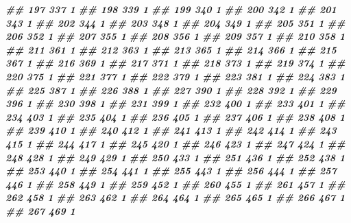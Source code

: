 \documentclass[
]{book}
\newenvironment{Shaded}{\begin{snugshade}}{\end{snugshade}}
\newcommand{\DocumentationTok}[1]{\textcolor[rgb]{0.56,0.35,0.01}{\textbf{\textit{#1}}}}
\theoremstyle{definition}
\theoremstyle{definition}
\theoremstyle{definition}
\theoremstyle{definition}
\theoremstyle{remark}
\begin{document}
\begin{Shaded}
\begin{Highlighting}[]
\DocumentationTok{\#\# 197    337 1}
\DocumentationTok{\#\# 198    339 1}
\DocumentationTok{\#\# 199    340 1}
\DocumentationTok{\#\# 200    342 1}
\DocumentationTok{\#\# 201    343 1}
\DocumentationTok{\#\# 202    344 1}
\DocumentationTok{\#\# 203    348 1}
\DocumentationTok{\#\# 204    349 1}
\DocumentationTok{\#\# 205    351 1}
\DocumentationTok{\#\# 206    352 1}
\DocumentationTok{\#\# 207    355 1}
\DocumentationTok{\#\# 208    356 1}
\DocumentationTok{\#\# 209    357 1}
\DocumentationTok{\#\# 210    358 1}
\DocumentationTok{\#\# 211    361 1}
\DocumentationTok{\#\# 212    363 1}
\DocumentationTok{\#\# 213    365 1}
\DocumentationTok{\#\# 214    366 1}
\DocumentationTok{\#\# 215    367 1}
\DocumentationTok{\#\# 216    369 1}
\DocumentationTok{\#\# 217    371 1}
\DocumentationTok{\#\# 218    373 1}
\DocumentationTok{\#\# 219    374 1}
\DocumentationTok{\#\# 220    375 1}
\DocumentationTok{\#\# 221    377 1}
\DocumentationTok{\#\# 222    379 1}
\DocumentationTok{\#\# 223    381 1}
\DocumentationTok{\#\# 224    383 1}
\DocumentationTok{\#\# 225    387 1}
\DocumentationTok{\#\# 226    388 1}
\DocumentationTok{\#\# 227    390 1}
\DocumentationTok{\#\# 228    392 1}
\DocumentationTok{\#\# 229    396 1}
\DocumentationTok{\#\# 230    398 1}
\DocumentationTok{\#\# 231    399 1}
\DocumentationTok{\#\# 232    400 1}
\DocumentationTok{\#\# 233    401 1}
\DocumentationTok{\#\# 234    403 1}
\DocumentationTok{\#\# 235    404 1}
\DocumentationTok{\#\# 236    405 1}
\DocumentationTok{\#\# 237    406 1}
\DocumentationTok{\#\# 238    408 1}
\DocumentationTok{\#\# 239    410 1}
\DocumentationTok{\#\# 240    412 1}
\DocumentationTok{\#\# 241    413 1}
\DocumentationTok{\#\# 242    414 1}
\DocumentationTok{\#\# 243    415 1}
\DocumentationTok{\#\# 244    417 1}
\DocumentationTok{\#\# 245    420 1}
\DocumentationTok{\#\# 246    423 1}
\DocumentationTok{\#\# 247    424 1}
\DocumentationTok{\#\# 248    428 1}
\DocumentationTok{\#\# 249    429 1}
\DocumentationTok{\#\# 250    433 1}
\DocumentationTok{\#\# 251    436 1}
\DocumentationTok{\#\# 252    438 1}
\DocumentationTok{\#\# 253    440 1}
\DocumentationTok{\#\# 254    441 1}
\DocumentationTok{\#\# 255    443 1}
\DocumentationTok{\#\# 256    444 1}
\DocumentationTok{\#\# 257    446 1}
\DocumentationTok{\#\# 258    449 1}
\DocumentationTok{\#\# 259    452 1}
\DocumentationTok{\#\# 260    455 1}
\DocumentationTok{\#\# 261    457 1}
\DocumentationTok{\#\# 262    458 1}
\DocumentationTok{\#\# 263    462 1}
\DocumentationTok{\#\# 264    464 1}
\DocumentationTok{\#\# 265    465 1}
\DocumentationTok{\#\# 266    467 1}
\DocumentationTok{\#\# 267    469 1}

\end{Highlighting}
\end{Shaded}
\end{document}
